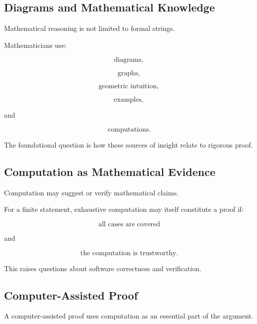 \subsection{Diagrams and Mathematical Knowledge}
\label{subsec:diagrams-mathematical-knowledge}

Mathematical reasoning is not limited to formal strings.

Mathematicians use:

\[
\boxed{
\text{diagrams},
}
\]

\[
\boxed{
\text{graphs},
}
\]

\[
\boxed{
\text{geometric intuition},
}
\]

\[
\boxed{
\text{examples},
}
\]

and

\[
\boxed{
\text{computations}.
}
\]

The foundational question is how these sources of insight relate to
rigorous proof.

\subsection{Computation as Mathematical Evidence}
\label{subsec:computation-mathematical-evidence}

Computation may suggest or verify mathematical claims.

For a finite statement, exhaustive computation may itself constitute a
proof if:

\[
\boxed{
\text{all cases are covered}
}
\]

and

\[
\boxed{
\text{the computation is trustworthy}.
}
\]

This raises questions about software correctness and verification.

\subsection{Computer-Assisted Proof}
\label{subsec:computer-assisted-proof}

A computer-assisted proof uses computation as an essential part of the
argument.

